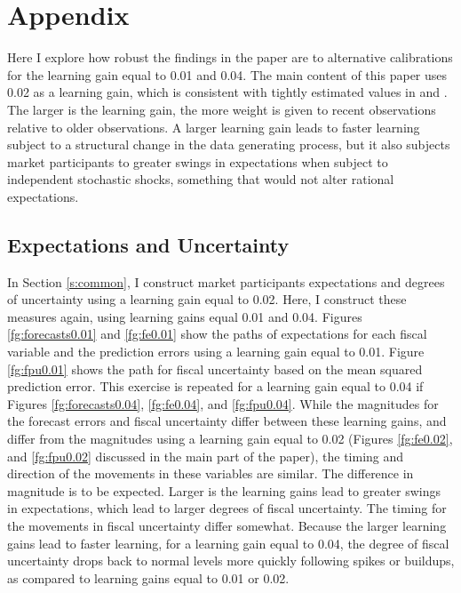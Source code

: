 \documentclass[11pt]{article}
\newcommand{\citee}[1]{\citet{#1}}
\begin{document}
\newpage
\nocite{*}
\begin{singlespace}


\end{singlespace}

\newpage
\appendix
\section{Appendix} 

Here I explore how robust the findings in the paper are to alternative calibrations for the learning gain equal to 0.01 and 0.04.  The main content of this paper uses 0.02 as a learning gain, which is consistent with tightly estimated values in \citee{milani2007} and \citee{slobodyan_wouters_2012}.  The larger is the learning gain, the more weight is given to recent observations relative to older observations.  A larger learning gain leads to faster learning subject to a structural change in the data generating process, but it also subjects market participants to greater swings in expectations when subject to independent stochastic shocks, something that would not alter rational expectations.  

\subsection{Expectations and Uncertainty}
In Section \ref{s:common}, I construct market participants expectations and degrees of uncertainty using a learning gain equal to 0.02.  Here, I construct these measures again, using learning gains equal 0.01 and 0.04.  Figures \ref{fg:forecasts0.01} and \ref{fg:fe0.01} show the paths of expectations for each fiscal variable and the prediction errors using a learning gain equal to 0.01.  Figure \ref{fg:fpu0.01} shows the path for fiscal uncertainty based on the mean squared prediction error.  This exercise is repeated for a learning gain equal to 0.04 if Figures \ref{fg:forecasts0.04}, \ref{fg:fe0.04}, and \ref{fg:fpu0.04}.  While the magnitudes for the forecast errors and fiscal uncertainty differ between these learning gains, and differ from the magnitudes using a learning gain equal to 0.02 (Figures \ref{fg:fe0.02}, and \ref{fg:fpu0.02} discussed in the main part of the paper), the timing and direction of the movements in these variables are similar.  The difference in magnitude is to be expected.  Larger is the learning gains lead to greater swings in expectations, which lead to larger degrees of fiscal uncertainty.  The timing for the movements in fiscal uncertainty differ somewhat.  Because the larger learning gains lead to faster learning, for a learning gain equal to 0.04, the degree of fiscal uncertainty drops back to normal levels more quickly following spikes or buildups, as compared to learning gains equal to 0.01 or 0.02.
\end{document}
